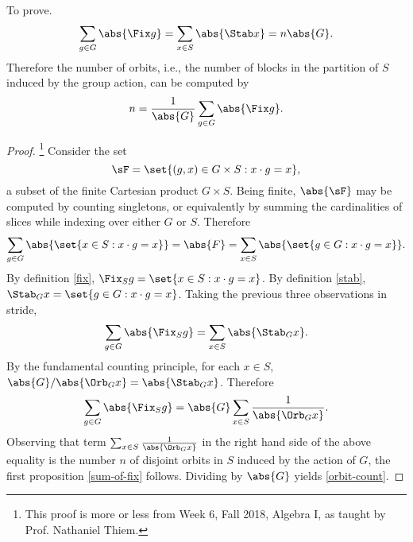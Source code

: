 \documentclass[onesided]{ccg-pset}
\begin{document}
\begin{enumerate}
    To prove. 
    \begin{equation}
        \label{sum-of-fix}
        \sum_{g \in G} \abs{\Fix g} = \sum_{x \in S} \abs{\Stab x} = n \abs{G}.
    \end{equation}
        Therefore the number of orbits, i.e., the number of blocks in the partition of $S$ induced by the group action, can be computed by
    \begin{equation}
        \label{orbit-count}
        n = \frac{1}{\abs{G}} \sum_{g \in G} \abs{\Fix g}.
    \end{equation}
 
    \begin{proof}
            \footnote{%
            This proof is more or less from Week 6, Fall 2018, Algebra I, as taught by Prof. Nathaniel Thiem.
            } Consider the set \begin{equation}\sF = \set{(g,x) \in G \times S : x \cdot g = x},\end{equation} a subset of the finite Cartesian product $G \times S$. 
            Being finite, $\abs{\sF}$ may be computed by counting singletons, or equivalently by summing the cardinalities of slices while indexing over either $G$ or $S$. 
        Therefore
        \begin{equation}
            \sum_{g \in G} \abs{\set{x \in S: x \cdot g = x}} = \abs{F} = \sum_{x \in S} \abs{\set{g \in G: x \cdot g = x}}.
        \end{equation}
        By definition \eqref{fix}, $\Fix_S g = \set{x \in S: x \cdot g = x}$. 
        By definition \eqref{stab}, $\Stab_G x = \set{g \in G: x \cdot g = x}$. 
        Taking the previous three observations in stride,
        \begin{equation*}
            \sum_{g \in G} \abs{\Fix_S g} = \sum_{x \in S}\abs{\Stab_G x}.
        \end{equation*}
        By the fundamental counting principle, for each $x \in S$, $\abs{G}/\abs{\Orb_G x} = \abs{\Stab_G x}$. 
        Therefore
        \begin{equation*}
            \sum_{g \in G} \abs{\Fix_S g} = \abs{G}\sum_{x \in S} \frac{1}{\abs{\Orb_G x}}.
        \end{equation*}
        Observing that term $\sum_{x \in S} \frac{1}{\abs{\Orb_G x}}$ in the right hand side of the above equality is the number $n$ of disjoint orbits in $S$ induced by the action of $G$, the first proposition \eqref{sum-of-fix} follows. Dividing by $\abs{G}$ yields \eqref{orbit-count}.
    \end{proof}


\end{enumerate}
\end{document}
